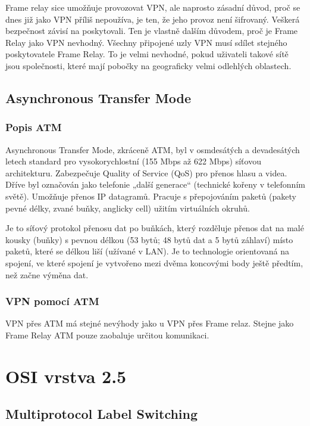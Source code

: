 \documentclass[thesis=B,czech]{FITthesis}[2012/06/26]
\begin{document}
        Frame relay sice umožňuje provozovat VPN, ale naprosto zásadní důvod, proč se dnes již jako VPN příliš nepoužíva, je ten, že jeho provoz není šifrovaný. Veškerá bezpečnost závisí na poskytovali. Ten je vlastně dalším důvodem, proč je Frame Relay jako VPN nevhodný. Všechny připojené uzly VPN musí sdílet stejného poskytovatele Frame Relay. To je velmi nevhodné, pokud uživateli takové sítě jsou společnosti, které mají pobočky na geograficky velmi odlehlých oblastech. \cite{frame_relay_vs_vpn}

    \subsection{Asynchronous Transfer Mode}

      \subsubsection{Popis ATM}
        Asynchronous Transfer Mode, zkráceně ATM, byl v osmdesátých a devadesátých letech standard pro vysokorychlostní (155 Mbps až 622 Mbps) síťovou architekturu. Zabezpečuje Quality of Service (QoS) pro přenos hlasu a videa. Dříve byl označován jako telefonie „další generace“ (technické kořeny v telefonním světě). Umožňuje přenos IP datagramů. Pracuje s přepojováním paketů (pakety pevné délky, zvané buňky, anglicky cell) užitím virtuálních okruhů.

        Je to síťový protokol přenosu dat po buňkách, který rozděluje přenos dat na malé kousky (buňky) s pevnou délkou (53 bytů; 48 bytů dat a 5 bytů záhlaví) místo paketů, které se délkou liší (užívané v LAN). Je to technologie orientovaná na spojení, ve které spojení je vytvořeno mezi dvěma koncovými body ještě předtím, než začne výměna dat.\cite{atm_wiki}

      \subsubsection{VPN pomocí ATM}

        VPN přes ATM má stejné nevýhody jako u VPN přes Frame relaz. Stejne jako Frame Relay ATM pouze zaobaluje určitou komunikaci.
        \cite{atm_vpn}

  \section{OSI vrstva 2.5}

    \subsection{Multiprotocol Label Switching}
\end{document}
